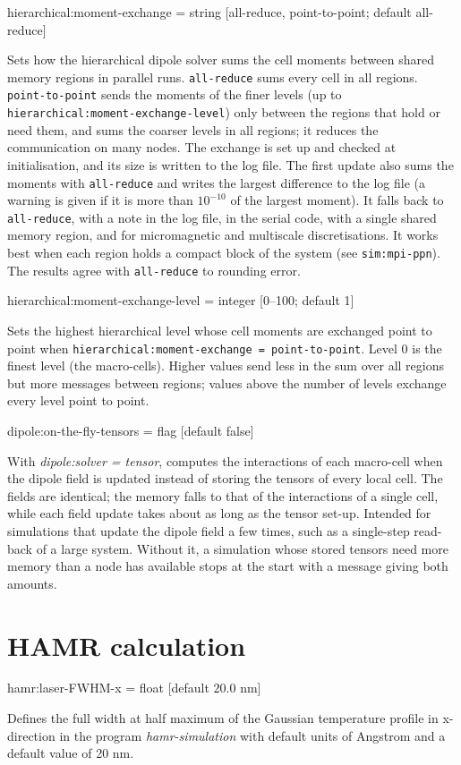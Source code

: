 {\zicf hierarchical:moment-exchange = string [all-reduce, point-to-point; default all-reduce]} Sets how the hierarchical dipole solver sums the cell moments between shared memory regions in parallel runs. \texttt{all-reduce} sums every cell in all regions. \texttt{point-to-point} sends the moments of the finer levels (up to \texttt{hierarchical:moment-exchange-level}) only between the regions that hold or need them, and sums the coarser levels in all regions; it reduces the communication on many nodes. The exchange is set up and checked at initialisation, and its size is written to the log file. The first update also sums the moments with \texttt{all-reduce} and writes the largest difference to the log file (a warning is given if it is more than $10^{-10}$ of the largest moment). It falls back to \texttt{all-reduce}, with a note in the log file, in the serial code, with a single shared memory region, and for micromagnetic and multiscale discretisations. It works best when each region holds a compact block of the system (see \texttt{sim:mpi-ppn}). The results agree with \texttt{all-reduce} to rounding error.

{\zicf hierarchical:moment-exchange-level = integer [0--100; default 1]} Sets the highest hierarchical level whose cell moments are exchanged point to point when \texttt{hierarchical:moment-exchange = point-to-point}. Level 0 is the finest level (the macro-cells). Higher values send less in the sum over all regions but more messages between regions; values above the number of levels exchange every level point to point.

{\zicf dipole:on-the-fly-tensors = flag [default false]} With \textit{dipole:solver = tensor}, computes the interactions of each macro-cell when the dipole field is updated instead of storing the tensors of every local cell. The fields are identical; the memory falls to that of the interactions of a single cell, while each field update takes about as long as the tensor set-up. Intended for simulations that update the dipole field a few times, such as a single-step read-back of a large system. Without it, a simulation whose stored tensors need more memory than a node has available stops at the start with a message giving both amounts.

\section*{HAMR calculation}
{\zicf hamr:laser-FWHM-x = float [default $20.0$ nm]}
Defines the full width at half maximum of the Gaussian temperature profile in x-direction
in the program \textit{hamr-simulation} with default units of Angstrom and a default value of 20 nm.

